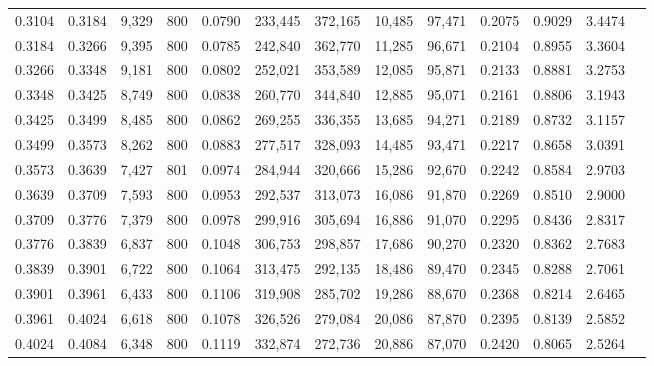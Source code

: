 \begin{tabular}{rrrrrrrrrrrrr}
0.3104 & 0.3184 &  9,329 &   800 &                                     0.0790 & 233,445 & 372,165 &  10,485 &  97,471 & 0.2075 & 0.9029 & 3.4474 \\
0.3184 & 0.3266 &  9,395 &   800 &                                     0.0785 & 242,840 & 362,770 &  11,285 &  96,671 & 0.2104 & 0.8955 & 3.3604 \\
0.3266 & 0.3348 &  9,181 &   800 &                                     0.0802 & 252,021 & 353,589 &  12,085 &  95,871 & 0.2133 & 0.8881 & 3.2753 \\
0.3348 & 0.3425 &  8,749 &   800 &                                     0.0838 & 260,770 & 344,840 &  12,885 &  95,071 & 0.2161 & 0.8806 & 3.1943 \\
0.3425 & 0.3499 &  8,485 &   800 &                                     0.0862 & 269,255 & 336,355 &  13,685 &  94,271 & 0.2189 & 0.8732 & 3.1157 \\
0.3499 & 0.3573 &  8,262 &   800 &                                     0.0883 & 277,517 & 328,093 &  14,485 &  93,471 & 0.2217 & 0.8658 & 3.0391 \\
0.3573 & 0.3639 &  7,427 &   801 &                                     0.0974 & 284,944 & 320,666 &  15,286 &  92,670 & 0.2242 & 0.8584 & 2.9703 \\
0.3639 & 0.3709 &  7,593 &   800 &                                     0.0953 & 292,537 & 313,073 &  16,086 &  91,870 & 0.2269 & 0.8510 & 2.9000 \\
0.3709 & 0.3776 &  7,379 &   800 &                                     0.0978 & 299,916 & 305,694 &  16,886 &  91,070 & 0.2295 & 0.8436 & 2.8317 \\
0.3776 & 0.3839 &  6,837 &   800 &                                     0.1048 & 306,753 & 298,857 &  17,686 &  90,270 & 0.2320 & 0.8362 & 2.7683 \\
0.3839 & 0.3901 &  6,722 &   800 &                                     0.1064 & 313,475 & 292,135 &  18,486 &  89,470 & 0.2345 & 0.8288 & 2.7061 \\
0.3901 & 0.3961 &  6,433 &   800 &                                     0.1106 & 319,908 & 285,702 &  19,286 &  88,670 & 0.2368 & 0.8214 & 2.6465 \\
0.3961 & 0.4024 &  6,618 &   800 &                                     0.1078 & 326,526 & 279,084 &  20,086 &  87,870 & 0.2395 & 0.8139 & 2.5852 \\
0.4024 & 0.4084 &  6,348 &   800 &                                     0.1119 & 332,874 & 272,736 &  20,886 &  87,070 & 0.2420 & 0.8065 & 2.5264 \\

\end{tabular}
